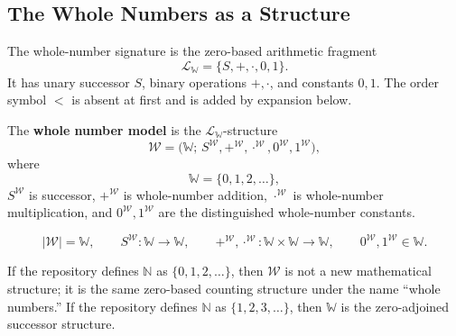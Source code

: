 \subsection{The Whole Numbers as a Structure}
\label{subsec:whole-numbers-as-a-structure}


\begin{remark*}[Exposition]
The whole-number signature is the zero-based arithmetic fragment
\[
\mathcal{L}_{\mathbb{W}}=\{S,+,\cdot,0,1\}.
\]
It has unary successor $S$, binary operations $+,\cdot$, and constants $0,1$.
The order symbol $<$ is absent at first and is added by expansion below.
\end{remark*}

\begin{definition}
\label{def:whole-number-model}
The \textbf{whole number model} is the $\mathcal{L}_{\mathbb{W}}$-structure
\[
\mathcal{W}
=
\bigl(\mathbb{W};\,
S^{\mathcal{W}},+^{\mathcal{W}},\cdot^{\mathcal{W}},
0^{\mathcal{W}},1^{\mathcal{W}}\bigr),
\]
where
\[
\mathbb{W}=\{0,1,2,\ldots\},
\]
$S^{\mathcal{W}}$ is successor, $+^{\mathcal{W}}$ is whole-number addition,
$\cdot^{\mathcal{W}}$ is whole-number multiplication, and
$0^{\mathcal{W}},1^{\mathcal{W}}$ are the distinguished whole-number constants.
\end{definition}

\begin{remark*}
\[
|\mathcal{W}|=\mathbb{W},\qquad
S^{\mathcal{W}}:\mathbb{W}\to\mathbb{W},\qquad
+^{\mathcal{W}},\cdot^{\mathcal{W}}:\mathbb{W}\times\mathbb{W}\to\mathbb{W},
\qquad
0^{\mathcal{W}},1^{\mathcal{W}}\in\mathbb{W}.
\]
\end{remark*}

\begin{remark*}[Interpretation]
If the repository defines $\mathbb{N}$ as $\{0,1,2,\ldots\}$, then
$\mathcal{W}$ is not a new mathematical structure; it is the same zero-based
counting structure under the name ``whole numbers.'' If the repository defines
$\mathbb{N}$ as $\{1,2,3,\ldots\}$, then $\mathbb{W}$ is the zero-adjoined
successor structure.
\end{remark*}

